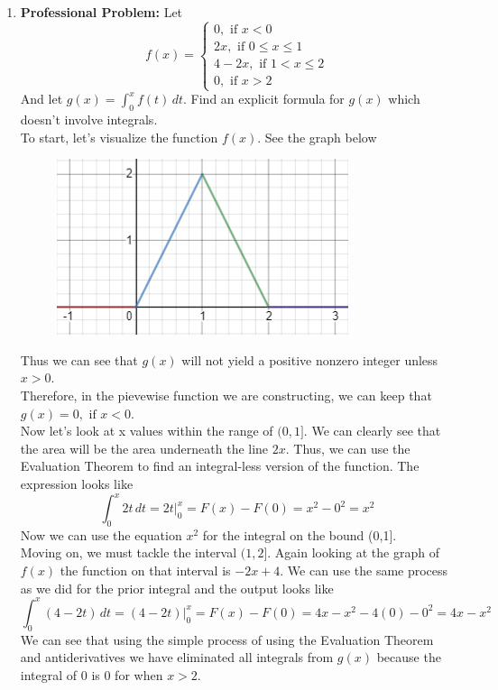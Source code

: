 \documentclass{article}
\begin{document}
\begin{enumerate}[label=\textbf{(2.\arabic*)}]
\item \textbf{Professional Problem:} Let
\[f(x)= \begin{cases}
0, \text{        if } x<0 \\
2x, \text{       if } 0\le x\le1 \\
4-2x, \text{       if } 1<x\le2 \\
0, \text{       if } x>2
\end{cases}\]
And let $g(x)=\displaystyle{ \int_0^x\!f(t)\,dt }$. Find an explicit formula for $g(x)$ which doesn't involve integrals. \\
\newline
To start, let's visualize the function $f(x)$. See the graph below
\begin{figure}[H]
\centering
\includegraphics[scale=.5]{twopointfour}
\end{figure}
Thus we can see that $g(x)$ will not yield a positive nonzero integer unless $x>0$. \\ 
Therefore, in the pievewise function we are constructing, we can keep that $g(x)=0, \text{ if } x<0$. \\
Now let's look at x values within the range of $(0,1]$.  We can clearly see that the area will be the area underneath the line $2x$. Thus, we can use the Evaluation Theorem to find an integral-less version of the function. The expression looks like
\[\int_0^x\!2t\,dt=2t{|}_0^x=F(x)-F(0)=x^2-0^2=x^2\]
Now we can use the equation $x^2$ for the integral on the bound (0,1]. \\
 Moving on, we must tackle the interval $(1,2]$. Again looking at the graph of $f(x)$ the function on that interval is $-2x+4$. We can use the same process as we did for the prior integral and the output looks like
 \[\int_0^x\!(4-2t)\,dt=(4-2t)|_0^x=F(x)-F(0)=4x-x^2-4(0)-0^2=4x-x^2\]
 We can see that using the simple process of using the Evaluation Theorem and antiderivatives we have eliminated all integrals from $g(x)$ because the integral of 0 is 0 for when $x>2$. \\

\end{enumerate}
\end{document}
